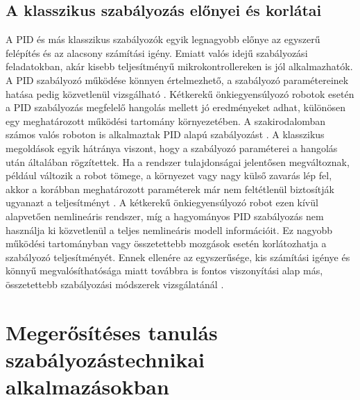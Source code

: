 \documentclass[12pt,a4paper]{report}
\begin{document}
	\subsection{A klasszikus szabályozás előnyei és korlátai}
	A PID és más klasszikus szabályozók egyik legnagyobb előnye az egyszerű felépítés és az alacsony számítási igény. Emiatt valós idejű szabályozási feladatokban, akár kisebb teljesítményű mikrokontrollereken is jól alkalmazhatók. A PID szabályozó működése könnyen értelmezhető, a szabályozó paramétereinek hatása pedig közvetlenül vizsgálható \cite{ang2005,zhangnor2025}.
	\newline
	\newline
	Kétkerekű önkiegyensúlyozó robotok esetén a PID szabályozás megfelelő hangolás mellett jó eredményeket adhat, különösen egy meghatározott működési tartomány környezetében. A szakirodalomban számos valós roboton is alkalmaztak PID alapú szabályozást \cite{zhangnor2025}.
	\newline
	\newline
	A klasszikus megoldások egyik hátránya viszont, hogy a szabályozó paraméterei a hangolás után általában rögzítettek. Ha a rendszer tulajdonságai jelentősen megváltoznak, például változik a robot tömege, a környezet vagy nagy külső zavarás lép fel, akkor a korábban meghatározott paraméterek már nem feltétlenül biztosítják ugyanazt a teljesítményt \cite{zhangnor2025}.
	\newline
	\newline
	A kétkerekű önkiegyensúlyozó robot ezen kívül alapvetően nemlineáris rendszer, míg a hagyományos PID szabályozás nem használja ki közvetlenül a teljes nemlineáris modell információit. Ez nagyobb működési tartományban vagy összetettebb mozgások esetén korlátozhatja a szabályozó teljesítményét. Ennek ellenére az egyszerűsége, kis számítási igénye és könnyű megvalósíthatósága miatt továbbra is fontos viszonyítási alap más, összetettebb szabályozási módszerek vizsgálatánál \cite{zhangnor2025}.
	
	
	\section{Megerősítéses tanulás szabályozástechnikai alkalmazásokban}
\end{document}
